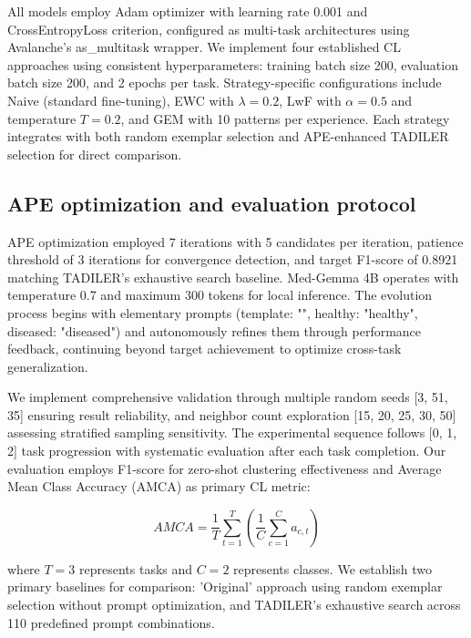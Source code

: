 \documentclass[pdflatex,sn-mathphys-num]{sn-jnl}%
\theoremstyle{thmstyleone}%
\theoremstyle{thmstyletwo}%
\theoremstyle{thmstylethree}%
\begin{document}
All models employ Adam optimizer with learning rate 0.001 and CrossEntropyLoss criterion, configured as multi-task architectures using Avalanche's as\_multitask wrapper. We implement four established CL approaches using consistent hyperparameters: training batch size 200, evaluation batch size 200, and 2 epochs per task. Strategy-specific configurations include Naive (standard fine-tuning), EWC with $\lambda = 0.2$, LwF with $\alpha = 0.5$ and temperature $T = 0.2$, and GEM with 10 patterns per experience. Each strategy integrates with both random exemplar selection and APE-enhanced TADILER selection for direct comparison.

\subsection{APE optimization and evaluation protocol}
APE optimization employed 7 iterations with 5 candidates per iteration, patience threshold of 3 iterations for convergence detection, and target F1-score of 0.8921 matching TADILER's exhaustive search baseline. Med-Gemma 4B operates with temperature 0.7 and maximum 300 tokens for local inference. The evolution process begins with elementary prompts (template: "", healthy: "healthy", diseased: "diseased") and autonomously refines them through performance feedback, continuing beyond target achievement to optimize cross-task generalization.

We implement comprehensive validation through multiple random seeds [3, 51, 35] ensuring result reliability, and neighbor count exploration [15, 20, 25, 30, 50] assessing stratified sampling sensitivity. The experimental sequence follows [0, 1, 2] task progression with systematic evaluation after each task completion. Our evaluation employs F1-score for zero-shot clustering effectiveness and Average Mean Class Accuracy (AMCA) as primary CL metric:

\begin{equation}
AMCA = \frac{1}{T} \sum_{t=1}^{T} \left( \frac{1}{C} \sum_{c=1}^{C} a_{c,t} \right)
\end{equation}

where $T=3$ represents tasks and $C=2$ represents classes. We establish two primary baselines for comparison: 'Original' approach using random exemplar selection without prompt optimization, and TADILER's exhaustive search across 110 predefined prompt combinations. 
\end{document}
